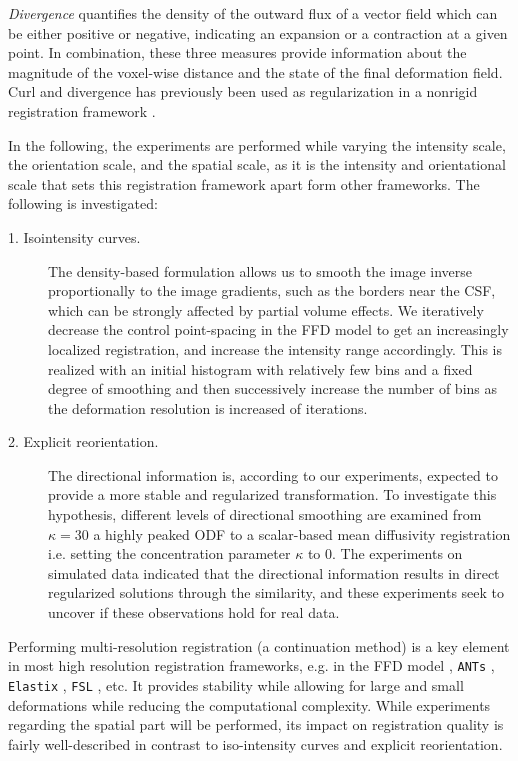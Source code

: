 \documentclass[twocolumn]{svjour3}
\begin{document}
\textit{Divergence} quantifies the density of the outward flux of a vector field which can
be either positive or negative, indicating an expansion or a contraction at a given
point. %
In combination, these three measures provide information about the magnitude of the
voxel-wise distance and the state of the final deformation field. Curl and divergence has
previously been used as regularization in a nonrigid registration framework
\cite{riyahi2014regularization}.

In the following, the experiments are performed while varying the intensity scale, the
orientation scale, and the spatial scale, as it is the intensity and orientational scale
that sets this registration framework apart form other frameworks. The following is
investigated:
\begin{description}
\item[1. Isointensity curves.] The density-based formulation allows us to smooth the image
  inverse proportionally to the image gradients, such as the borders near the CSF, which
  can be strongly affected by partial volume effects. We iteratively decrease the control
  point-spacing in the FFD model to get an increasingly localized registration, and
  increase the intensity range accordingly. This is realized with an initial histogram
  with relatively few bins and a fixed degree of smoothing and then successively increase
  the number of bins as the deformation resolution is increased of iterations.
\item[2. Explicit reorientation.] The directional information is, according to our
  experiments, expected to provide a more stable and regularized transformation. To
  investigate this hypothesis, different levels of directional smoothing are examined from
  $\kappa=30$ a highly peaked ODF to a scalar-based mean diffusivity registration
  i.e. setting the concentration parameter $\kappa$ to $0$. The experiments on simulated
  data indicated that the directional information results in direct regularized solutions
  through the similarity, and these experiments seek to uncover if these observations hold
  for real data.
\end{description}
Performing multi-resolution registration (a continuation method) is a key element in most
high resolution registration frameworks, e.g. in the FFD model
\cite{rueckert1999nonrigid}, \texttt{ANTs} \cite{avants2009advanced}, \texttt{Elastix}
\cite{klein2010elastix}, \texttt{FSL} \cite{jenkinson2012fsl}, etc. It provides stability
while allowing for large and small deformations while reducing the computational
complexity. While experiments regarding the spatial part will be performed, its impact on
registration quality is fairly well-described in contrast to iso-intensity curves and
explicit reorientation.
\end{document}
